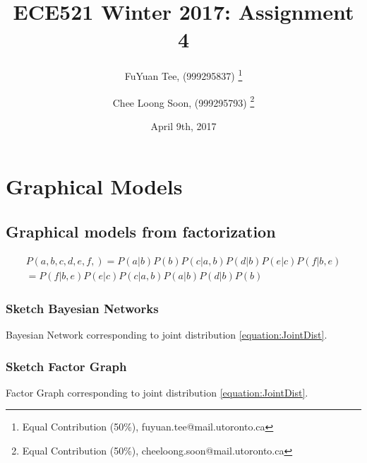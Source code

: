 \documentclass[a4paper,12pt]{article}
\title{ECE521 Winter 2017: Assignment 4}
\author{FuYuan Tee, (999295837)
  \thanks{Equal Contribution (50\%), fuyuan.tee@mail.utoronto.ca}
\and Chee Loong Soon, (999295793) \thanks{Equal Contribution (50\%),  cheeloong.soon@mail.utoronto.ca}}
\date{April 9th, 2017}
\begin{document}
\maketitle
\tableofcontents
\clearpage

\section{Graphical Models}
\subsection{Graphical models from factorization}

\begin{equation}
\label{equation:JointDist}
\begin{split}
P(a,b,c,d,e,f,) = P(a|b)P(b)P(c|a,b)P(d|b)P(e|c)P(f|b,e) \\
=  P(f|b,e)P(e|c)P(c|a,b)P(a|b)P(d|b)P(b)
\end{split}
\end{equation}

\subsubsection{Sketch Bayesian Networks}
Bayesian Network corresponding to joint distribution \ref{equation:JointDist}.

\begin{figure}[!htb]
\centering
{}
\end{figure}

\clearpage

\subsubsection{Sketch Factor Graph}
Factor Graph corresponding to joint distribution \ref{equation:JointDist}.
\end{document}
